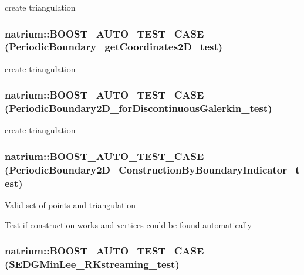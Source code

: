 create triangulation \hypertarget{namespacenatrium_a6742e53417be0f418326a958ef719cd0}{
\subsubsection[{BOOST\_\-AUTO\_\-TEST\_\-CASE}]{\setlength{\rightskip}{0pt plus 5cm}natrium::BOOST\_\-AUTO\_\-TEST\_\-CASE (PeriodicBoundary\_\-getCoordinates2D\_\-test)}}
\label{namespacenatrium_a6742e53417be0f418326a958ef719cd0}


create triangulation \hypertarget{namespacenatrium_ac3aa16cb6afbde804febb51c503b72e3}{
\subsubsection[{BOOST\_\-AUTO\_\-TEST\_\-CASE}]{\setlength{\rightskip}{0pt plus 5cm}natrium::BOOST\_\-AUTO\_\-TEST\_\-CASE (PeriodicBoundary2D\_\-forDiscontinuousGalerkin\_\-test)}}
\label{namespacenatrium_ac3aa16cb6afbde804febb51c503b72e3}


create triangulation \hypertarget{namespacenatrium_a4090d871d84ad4fb470c0b909c8aa3a2}{
\subsubsection[{BOOST\_\-AUTO\_\-TEST\_\-CASE}]{\setlength{\rightskip}{0pt plus 5cm}natrium::BOOST\_\-AUTO\_\-TEST\_\-CASE (PeriodicBoundary2D\_\-ConstructionByBoundaryIndicator\_\-test)}}
\label{namespacenatrium_a4090d871d84ad4fb470c0b909c8aa3a2}


Valid set of points and triangulation

Test if construction works and vertices could be found automatically \hypertarget{namespacenatrium_a5d50c8f7b1a7391f2433de8b308a11e7}{
\subsubsection[{BOOST\_\-AUTO\_\-TEST\_\-CASE}]{\setlength{\rightskip}{0pt plus 5cm}natrium::BOOST\_\-AUTO\_\-TEST\_\-CASE (SEDGMinLee\_\-RKstreaming\_\-test)}}
\label{namespacenatrium_a5d50c8f7b1a7391f2433de8b308a11e7}


